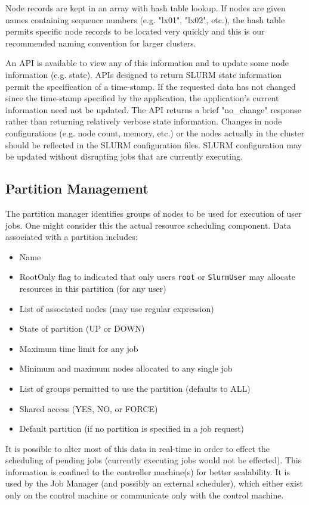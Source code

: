 Node records are kept in an array with hash table lookup. 
If nodes are given names containing sequence numbers (e.g. "lx01", "lx02", 
etc.), the hash table permits specific node records to be located 
very quickly and this is our recommended naming convention for larger 
clusters.

An API is available to view any of this information and to update some 
node information (e.g. state). APIs designed to return SLURM
state information permit the specification of a time-stamp.  If the
requested data has not changed since the time-stamp specified by the
application, the application's current information need not be updated.
The API returns a brief "no\_change" response rather than returning
relatively verbose state information.
Changes in node configurations (e.g. node count, memory, etc.) or the nodes 
actually in the cluster should be reflected in the SLURM configuration 
files. SLURM configuration may be updated without disrupting jobs 
that are currently executing.

\subsection{Partition Management}

The partition manager identifies groups of nodes to be used for
execution of user jobs. One might consider this the actual resource 
scheduling component. 
Data associated with a partition includes:
\begin{itemize}
\item Name
\item RootOnly flag to indicated that only users {\tt root} or 
{\tt SlurmUser} may allocate resources in this partition (for any user)
\item List of associated nodes (may use regular expression)
\item State of partition (UP or DOWN)
\item Maximum time limit for any job
\item Minimum and maximum nodes allocated to any single job
\item List of groups permitted to use the partition (defaults to ALL)
\item Shared access (YES, NO, or FORCE)
\item Default partition (if no partition is specified in a job request)
\end{itemize}

It is possible to alter most of this data in real-time in order
to effect the scheduling of pending jobs (currently executing jobs
would not be effected).  This information is confined to the controller
machine(s) for better scalability.  It is used by the Job Manager
(and possibly an external scheduler), which either exist only on the
control machine or communicate only with the control machine. 

